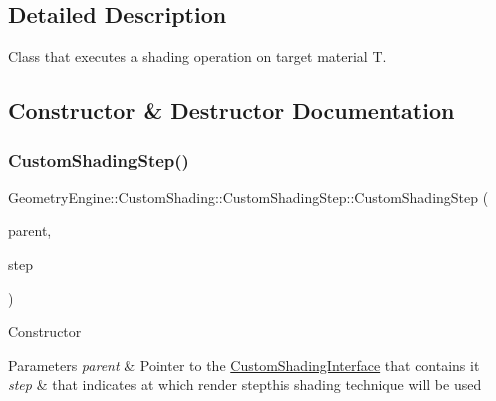 \subsection{Detailed Description}
Class that executes a shading operation on target material T. 

\subsection{Constructor \& Destructor Documentation}
\mbox{\label{class_geometry_engine_1_1_custom_shading_1_1_custom_shading_step_aa1a71e276f9a94557ca2fd8db4c1f438}} 
\subsubsection{\texorpdfstring{CustomShadingStep()}{CustomShadingStep()}\hspace{0.1cm}{\footnotesize\ttfamily [1/2]}}
{\footnotesize\ttfamily Geometry\+Engine\+::\+Custom\+Shading\+::\+Custom\+Shading\+Step\+::\+Custom\+Shading\+Step (\begin{DoxyParamCaption}\item[{\mbox{\hyperlink{class_geometry_engine_1_1_custom_shading_1_1_custom_shading_interface}{Custom\+Shading\+Interface}} $\ast$}]{parent,  }\item[{\mbox{\hyperlink{namespace_geometry_engine_1_1_custom_shading_a2dc236a5b567da5099069ce2b2be5609}{Custom\+Shading\+Steps}}}]{step }\end{DoxyParamCaption})}

Constructor 
\begin{DoxyParams}{Parameters}
{\em parent} & Pointer to the \mbox{\hyperlink{class_geometry_engine_1_1_custom_shading_1_1_custom_shading_interface}{Custom\+Shading\+Interface}} that contains it \\
\hline
{\em step} & that indicates at which render stepthis shading technique will be used \\
\hline
\end{DoxyParams}
\mbox{\label{class_geometry_engine_1_1_custom_shading_1_1_custom_shading_step_a78d86dd99b93d0ae1c9a4de8f01a4f1a}} 
